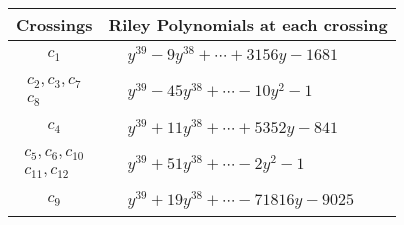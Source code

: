 \documentclass[1p]{elsarticle_modified}
\theoremstyle{definition}
\begin{document}
\begin{tabular}{m{50pt}|m{274pt}}
Crossings & \hspace{64pt}Riley Polynomials at each crossing \\
\hline $$\begin{aligned}c_{1}\end{aligned}$$&$\begin{aligned}
&y^{39}-9 y^{38}+\cdots+3156 y-1681
\end{aligned}$\\
\hline $$\begin{aligned}c_{2},c_{3},c_{7}\\c_{8}\end{aligned}$$&$\begin{aligned}
&y^{39}-45 y^{38}+\cdots-10 y^2-1
\end{aligned}$\\
\hline $$\begin{aligned}c_{4}\end{aligned}$$&$\begin{aligned}
&y^{39}+11 y^{38}+\cdots+5352 y-841
\end{aligned}$\\
\hline $$\begin{aligned}c_{5},c_{6},c_{10}\\c_{11},c_{12}\end{aligned}$$&$\begin{aligned}
&y^{39}+51 y^{38}+\cdots-2 y^2-1
\end{aligned}$\\
\hline $$\begin{aligned}c_{9}\end{aligned}$$&$\begin{aligned}
&y^{39}+19 y^{38}+\cdots-71816 y-9025
\end{aligned}$\\
\hline
\end{tabular}
\vskip 2pc
\end{document}
